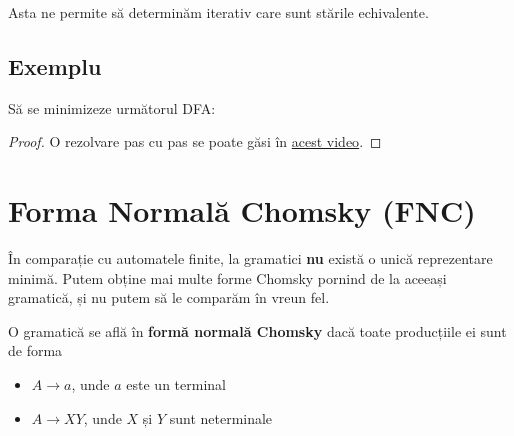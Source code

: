 Asta ne permite să determinăm iterativ care sunt stările echivalente.

\subsection*{Exemplu}

Să se minimizeze următorul DFA:
\begin{figure}[H]
    \centering
\end{figure}
\begin{proof}
    O rezolvare pas cu pas se poate găsi în \href{https://www.youtube.com/watch?v=Dx2RJ2DXRYs}{acest video}.
\end{proof}

\section*{Forma Normală Chomsky (FNC)}

În comparație cu automatele finite, la gramatici \textbf{nu} există o unică reprezentare minimă. Putem obține mai multe forme Chomsky pornind de la aceeași gramatică, și nu putem să le comparăm în vreun fel.

O gramatică se află în \textbf{formă normală Chomsky} dacă toate producțiile ei sunt de forma
\begin{itemize}
    \item \(A \to a\), unde \(a\) este un terminal
    \item \(A \to XY\), unde \(X\) și \(Y\) sunt neterminale
\end{itemize}

